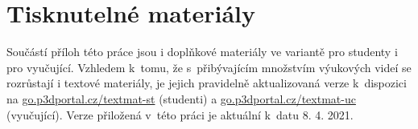 \chapter{Tisknutelné materiály}
Součástí příloh této práce jsou i doplňkové materiály ve variantě pro studenty i pro vyučující.
Vzhledem k~tomu, že s~přibývajícím množstvím výukových videí se rozrůstají i textové materiály, je jejich pravidelně aktualizovaná verze k~dispozici na \href{https://go.p3dportal.cz/textmat-st}{go.p3dportal.cz/textmat-st} (studenti) a \href{https://go.p3dportal.cz/textmat-uc}{go.p3dportal.cz/textmat-uc} (vyučující).
Verze přiložená v~této práci je aktuální k~datu 8. 4. 2021.
